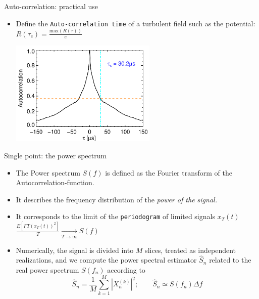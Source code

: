 \documentclass[t,10pt]{beamer}
\begin{document}
\begin{frame}{Auto-correlation: practical use}
\begin{itemize}
\item Define the \textcolor{ta3chameleon}{\texttt{Auto-correlation time}} of
  a turbulent field such as the potential: $R(\tau_c)=\frac{\text{max}(R(\tau))}{e}$

\begin{center}
\includegraphics[height=5cm]{Auto-correlation20367}
\end{center}

\end{itemize}
\end{frame}

\begin{frame}{Single point: the power spectrum}
\begin{itemize}[<+->]
\item The \textcolor{ta3skyblue}{Power spectrum $S(f)$} is defined as the
  Fourier transform of the Autocorrelation-function.
\item It describes the frequency distribution of the \emph{power of
    the signal.} 
\item It corresponds to the limit of the
  \textcolor{ta3skyblue}{\texttt{periodogram}}  of limited signals $x_T(t)$
 $\frac{E[FT(x_T(t)) ^2]}{T}\xrightarrow[T\rightarrow \infty]{} S(f)$
\item Numerically, the signal is divided into $M$ slices, treated as
  independent realizations, and we compute the power spectral estimator $\hat{S}_n$
 related to the real power spectrum $S(f_n)$ according to
\begin{equation*}
\hat{S}_n = \frac{1}{M}\sum_{k=1}^{M}|X_n^{(k)}|^2; \qquad \hat{S}_n
\simeq S(f_n)\Delta f
\end{equation*}
\end{itemize}
\end{frame}
\end{document}
